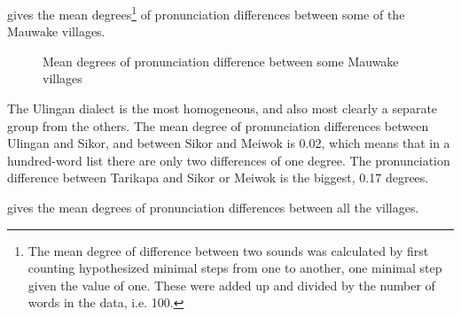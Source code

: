  gives the mean degrees\footnote{The mean degree of difference between two sounds was calculated by first counting hypothesized minimal steps from one to another, one minimal step given the value of one. These were added up and divided by the number of words in the data, i.e. 100.} of pronunciation differences between some of the Mauwake villages. 


\begin{figure}
\caption{Mean degrees of pronunciation difference between some Mauwake villages}
\label{map:5:pronunciationdiff}

\end{figure}



The Ulingan dialect is the most homogeneous, and also most clearly a separate group from the others. The mean degree of pronunciation differences between Ulingan and Sikor, and between Sikor and Meiwok is 0.02, which means that in a hundred-word list there are only two differences of one degree.  The pronunciation difference between Tarikapa and Sikor or Meiwok is the biggest, 0.17 degrees. 

 gives the mean degrees of pronunciation differences between all the villages.


